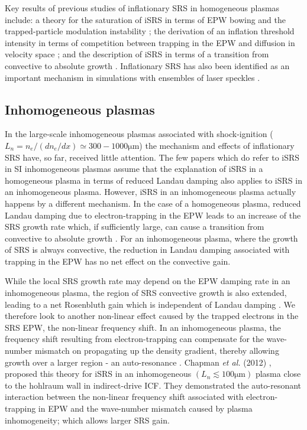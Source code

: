  Key results of previous studies of inflationary SRS in homogeneous plasmas include: a theory for the saturation
 of iSRS in terms of EPW bowing and the trapped-particle modulation instability \cite{Yin2008}; the derivation
 of an inflation threshold intensity in terms of competition between trapping in the EPW and diffusion in
 velocity space \cite{Vu2007}; and the description of iSRS in terms of a transition from convective to absolute
 growth \cite{Wang2018}. Inflationary SRS has also been identified as an important mechanism in simulations  with ensembles of laser speckles \cite{Yin2012,Winjum2019}.

\subsection{Inhomogeneous plasmas}

 In the large-scale inhomogeneous plasmas associated with shock-ignition ($L_n =n_e/(dn_e/dx) \simeq 300-1000 \si{\micro\metre}$) the mechanism and effects of inflationary SRS have, so far, received little attention. The few papers which do refer to iSRS in SI inhomogeneous plasmas assume that the explanation of iSRS in a homogeneous plasma in terms of reduced Landau damping also applies to iSRS in an inhomogeneous plasma. However, iSRS in an inhomogeneous plasma actually happens by a different mechanism. In the case of a homogeneous plasma, reduced Landau damping due to electron-trapping in the EPW leads to an increase of the SRS growth rate which, if sufficiently large, can cause a transition from convective to absolute growth \cite{Wang2018}. For an inhomogeneous plasma, where the growth of SRS is always convective, the reduction in Landau damping associated with trapping in the EPW has no net effect on the convective gain.
 
 While the local SRS growth rate may depend on the EPW damping rate in an inhomogeneous plasma, the region of SRS convective growth is also extended, leading to a net Rosenbluth gain\cite{Rosenbluth1972} which is independent of Landau damping \cite{Williams1991,Liu1994}. We therefore look to another non-linear effect caused by the trapped electrons in the SRS EPW, the non-linear frequency shift\cite{Morales1972}. In an inhomogeneous plasma, the frequency shift resulting from electron-trapping can compensate for the wave-number mismatch on propagating up the density gradient, thereby allowing
 growth over a larger region - an auto-resonance \cite{Chapman2010,Chapman2012}. Chapman {\it et al.} (2012) \cite{Chapman2012},  proposed this theory for iSRS in an inhomogeneous $(L_n \lesssim 100
 \si{\micro\metre})$ plasma close to the hohlraum wall in indirect-drive ICF. They demonstrated the auto-resonant
 interaction\cite{Chapman2010} between the non-linear frequency shift associated with electron-trapping in EPW
 and the wave-number mismatch caused by plasma inhomogeneity; which allows larger SRS gain\cite{Chapman2012}.


